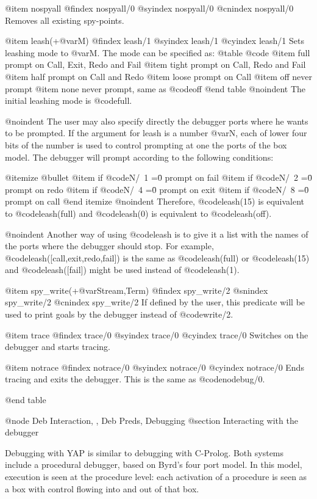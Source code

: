 @item nospyall
@findex nospyall/0
@syindex nospyall/0
@cnindex nospyall/0
Removes all existing spy-points.

@item leash(+@var{M})
@findex leash/1
@syindex leash/1
@cyindex leash/1
 Sets leashing mode to @var{M}.
The mode can be specified as:
@table @code
@item full
prompt on Call, Exit, Redo and Fail
@item tight
prompt on Call, Redo and Fail
@item half
prompt on Call and Redo
@item loose
prompt on Call
@item off
never prompt
@item none
never prompt, same as @code{off}
@end table
@noindent
The initial leashing mode is @code{full}.


@noindent
The user may also specify directly the debugger ports 
where he wants to be prompted. If the argument for leash 
is a number @var{N}, each of lower four bits of the number is used to
control prompting at one the ports of the box model. The debugger will 
prompt according to the following conditions:

@itemize @bullet
@item
if @code{N/\ 1 =\= 0}  prompt on fail 
@item
if @code{N/\ 2 =\= 0} prompt on redo
@item
if @code{N/\ 4 =\= 0} prompt on exit
@item
if @code{N/\ 8 =\= 0} prompt on call
@end itemize
@noindent
Therefore, @code{leash(15)} is equivalent to @code{leash(full)} and
@code{leash(0)} is equivalent to @code{leash(off)}.

@noindent
Another way of using @code{leash} is to give it a list with the names of
the ports where the debugger should stop. For example,
@code{leash([call,exit,redo,fail])} is the same as @code{leash(full)} or
@code{leash(15)} and @code{leash([fail])} might be used instead of
@code{leash(1)}.

@item spy_write(+@var{Stream},Term)
@findex spy_write/2
@snindex spy_write/2
@cnindex spy_write/2
If defined by the user, this predicate will be used to print goals by
the debugger instead of @code{write/2}.

@item trace
@findex trace/0
@syindex trace/0
@cyindex trace/0
Switches on the debugger and starts tracing.

@item notrace
@findex notrace/0
@syindex notrace/0
@cyindex notrace/0
Ends tracing and exits the debugger. This is the same as
@code{nodebug/0}.

@end table


@node Deb Interaction, , Deb Preds, Debugging
@section Interacting with the debugger

Debugging with YAP is similar to debugging with C-Prolog. Both systems
include a procedural debugger, based on Byrd's four port model. In this
model, execution is seen at the procedure level: each activation of a
procedure is seen as a box with control flowing into and out of that
box.

